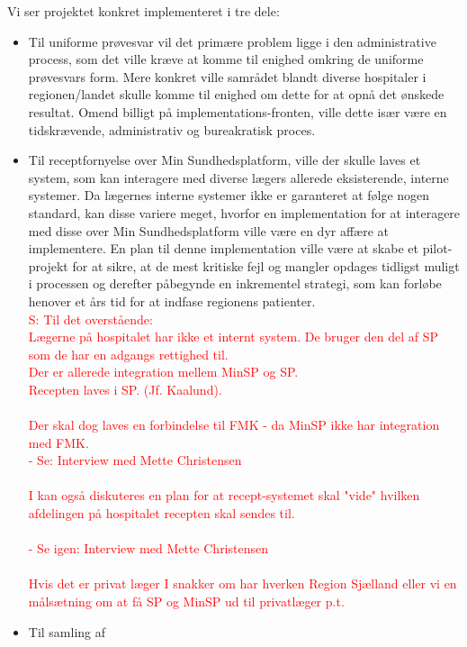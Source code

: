 Vi ser projektet konkret implementeret i tre dele:\\
\begin{itemize}
	\item Til uniforme prøvesvar vil det primære problem ligge i den administrative process, som det ville kræve at komme til enighed omkring de uniforme prøvesvars form. Mere konkret ville samrådet blandt diverse hospitaler i regionen/landet skulle komme til enighed om dette for at opnå det ønskede resultat. Omend billigt på implementations-fronten, ville dette især være en tidskrævende, administrativ og bureakratisk proces. 
	\item Til receptfornyelse over Min Sundhedsplatform, ville der skulle laves et system, som kan interagere med diverse lægers allerede eksisterende, interne systemer. Da lægernes interne systemer ikke er garanteret at følge nogen standard, kan disse variere meget, hvorfor en implementation for at interagere med disse over Min Sundhedsplatform ville være en dyr affære at implementere. En plan til denne implementation ville være at skabe et pilot-projekt for at sikre, at de mest kritiske fejl og mangler opdages tidligst muligt i processen og derefter påbegynde en inkrementel strategi, som kan forløbe henover et års tid for at indfase regionens patienter.   
\textcolor{red}{\\
	S: Til det overstående:\\	
	Lægerne på hospitalet har ikke et internt system. De bruger den del af SP som de har en adgangs rettighed til. \\
	Der er allerede integration mellem MinSP og SP.\\
	Recepten laves i SP. (Jf. Kaalund).	\\
	\\
	Der skal dog laves en forbindelse til FMK - da MinSP ikke har integration med FMK.\\
	- Se: Interview med Mette Christensen \\
	\\
	I kan også diskuteres en plan for at recept-systemet skal "vide" hvilken afdelingen på hospitalet recepten skal sendes til.\\
	\\
	- Se igen: Interview med Mette Christensen\\
	\\
	Hvis det er privat læger I snakker om har hverken Region Sjælland eller vi en målsætning om at få SP og MinSP ud til privatlæger p.t.\\
}
	\item Til samling af 

\end{itemize}
